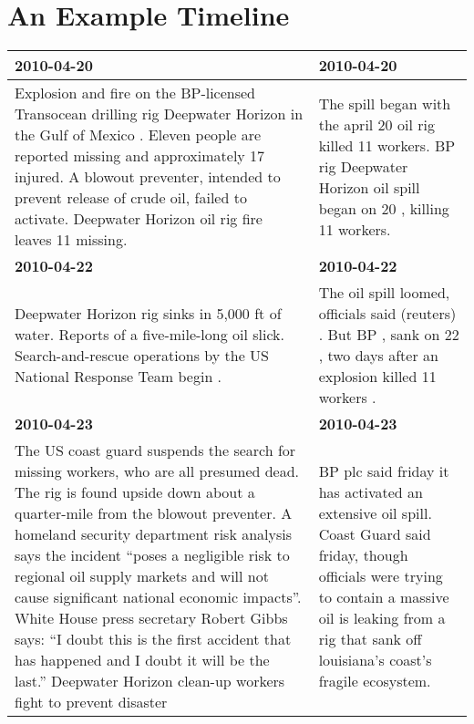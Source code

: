 \documentclass[a4paper,BCOR=10mm]{report}
\numberwithin{lemma}{chapter}
\numberwithin{definition}{chapter}
\begin{document}
\section{An Example Timeline}

\begin{table}
\begin{tabularx}{1.2\textwidth}{|X|X|}
\hline
\textbf{2010-04-20} & \textbf{2010-04-20} \\\hline
Explosion and fire on the BP-licensed Transocean drilling rig Deepwater Horizon in the Gulf of Mexico . \newline Eleven people are reported missing and approximately 17 injured. \newline A blowout preventer, intended to prevent release of crude oil, failed to activate. \newline Deepwater Horizon oil rig fire leaves 11 missing. & The spill began with the april 20 oil rig killed 11 workers. \newline BP rig Deepwater Horizon oil spill began on 20 , killing 11 workers. \\\hline
\textbf{2010-04-22} & \textbf{2010-04-22} \\\hline
Deepwater Horizon rig sinks in 5,000 ft of water. \newline Reports of a five-mile-long oil slick. \newline Search-and-rescue operations by the US National Response Team begin . & The oil spill loomed, officials said (reuters) . \newline But BP , sank on 22 , two days after an explosion killed 11 workers . \\\hline
\textbf{2010-04-23} & \textbf{2010-04-23} \\\hline
The US coast guard suspends the search for missing workers, who are all presumed dead. \newline The rig is found upside down about a quarter-mile from the blowout preventer. \newline A homeland security department risk analysis says the incident ``poses a negligible risk to regional oil supply markets and will not cause significant national economic impacts''. \newline White House press secretary Robert Gibbs says: ``I doubt this is the first accident that has happened and I doubt it will be the last.'' \newline Deepwater Horizon clean-up workers fight to prevent disaster & BP plc said friday it has activated an extensive oil spill. \newline Coast Guard said friday, though officials were trying to contain a massive oil is leaking from a rig that sank off louisiana's coast's fragile ecosystem. \\\hline

\end{tabularx}
\end{table}
\end{document}
